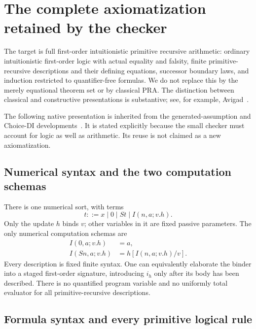 \documentclass[11pt,letterpaper]{article}
\theoremstyle{definition}\newtheorem{definition}[theorem]{Definition}
\theoremstyle{remark}\newtheorem{remark}[theorem]{Remark}
\begin{document}
\section{The complete axiomatization retained by the checker}
\label{sec:calculus}

The target is full first-order intuitionistic primitive recursive
arithmetic: ordinary intuitionistic first-order logic with actual
equality and falsity, finite primitive-recursive descriptions and their
defining equations, successor boundary laws, and induction restricted
to quantifier-free formulas. We do not replace this by the merely
equational theorem set or by classical PRA. The distinction between
classical and constructive presentations is substantive; see, for
example, Avigad~\cite{avigad}.

The following native presentation is inherited from the generated-assumption
and Choice-DI developments~\cite{generated,constructed}. It is stated
explicitly because the small checker must account for logic as well as
arithmetic. Its reuse is not claimed as a new axiomatization.

\subsection{Numerical syntax and the two computation schemas}

There is one numerical sort, with terms
\[
             t::=x\mid0\mid St\mid I(n,a;v.h).
\]
Only the update $h$ binds $v$; other variables in it are fixed passive
parameters. The only numerical computation schemas are
\begin{align}
 I(0,a;v.h)&=a,\tag{I0}\label{eq:main-I0}\\
 I(Sn,a;v.h)&=h[I(n,a;v.h)/v].\tag{IS}\label{eq:main-IS}
\end{align}
Every description is fixed finite syntax. One can equivalently elaborate
the binder into a staged first-order signature, introducing $i_h$ only
after its body has been described. There is no quantified program variable
and no uniformly total evaluator for all primitive-recursive descriptions.

\subsection{Formula syntax and every primitive logical rule}
\end{document}
